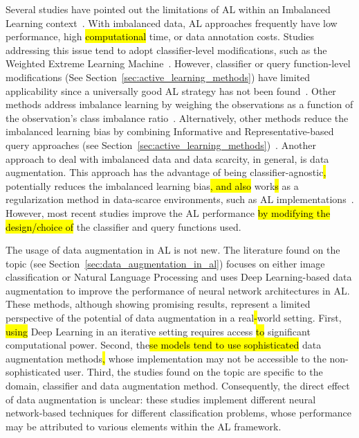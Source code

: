 \documentclass[preprint, 12pt]{elsarticle}
\begin{document}
Several studies have pointed out the limitations of AL within an Imbalanced
Learning context~\cite{Yu2019}. With imbalanced data, AL approaches frequently
have low performance, high \hl{computational} time, or\hl{ }data annotation
costs.  Studies addressing this issue tend to adopt classifier-level
modifications, such as the Weighted Extreme Learning Machine~\cite{Yu2019,
Zong2013, Qin2021}. However, classifier or query function-level modifications
(See Section~\ref{sec:active_learning_methods}) have limited applicability
since a universally good AL strategy has not been found~\cite{Sener2018}.
Other methods address imbalance learning by weighing the observations as a
function of the observation's class imbalance ratio~\cite{Liu2021}.
Alternatively, other methods\hl{ }reduce the imbalanced learning bias
by combining Informative and Representative-based query approaches (see
Section~\ref{sec:active_learning_methods})~\cite{Tharwat2020}. Another
approach to deal with imbalanced data and data scarcity, in general, is data
augmentation. This approach has the advantage of being\hl{
}classifier-agnostic\hl{, }potentially reduces the imbalanced learning
bias\hl{, and also} work\hl{s} as a regularization method in data-scarce
environments, such as AL implementations~\cite{Kim2021}. However, most recent
studies\hl{ }improve the AL performance \hl{by modifying the design/choice of}
the classifier and query functions used.
 
The usage of data augmentation in AL is not new. The literature found on the
topic (see Section~\ref{sec:data_augmentation_in_al}) focuses on either image
classification or Natural Language Processing and uses Deep Learning-based
data augmentation to improve the performance of neural network architectures
in AL\@. These methods, although showing promising results, represent a
limited perspective of the potential of data augmentation in a real\hl{-}world
setting. First, \hl{using} Deep Learning in an iterative setting requires\hl{
}access \hl{to} significant computational power. Second, the\hl{se models tend
to use sophisticated} data augmentation
methods\hl{,} whose implementation may not be
accessible to the non-sophisticated user. Third, the studies found on the
topic are specific to the domain, classifier and data augmentation method.
Consequently, the direct effect of data augmentation is unclear: these studies
implement different neural network-based techniques for different
classification problems, whose performance may be attributed to various
elements within the AL framework.
\end{document}
